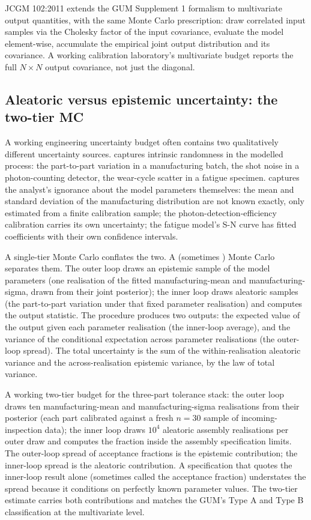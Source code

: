 JCGM 102:2011 \cite{std:jcgm-101} extends the GUM Supplement 1
formalism to multivariate output quantities, with the same Monte
Carlo prescription: draw correlated input samples via the
Cholesky factor of the input covariance, evaluate the model
element-wise, accumulate the empirical joint output distribution
and its covariance. A working calibration laboratory's
multivariate budget reports the full $N \times N$ output
covariance, not just the diagonal.

\subsection{Aleatoric versus epistemic uncertainty: the two-tier MC}

A working engineering uncertainty budget often contains two
qualitatively different uncertainty sources.  captures intrinsic randomness in the modelled
process: the part-to-part variation in a manufacturing batch, the
shot noise in a photon-counting detector, the wear-cycle scatter
in a fatigue specimen.  captures
the analyst's ignorance about the model parameters themselves:
the mean and standard deviation of the manufacturing distribution
are not known exactly, only estimated from a finite calibration
sample; the photon-detection-efficiency calibration carries its
own uncertainty; the fatigue model's S-N curve has fitted
coefficients with their own confidence intervals.

A single-tier Monte Carlo conflates the two. A
 (sometimes ) Monte Carlo
separates them. The outer loop draws an epistemic sample of the
model parameters (one realisation of the fitted manufacturing-mean
and manufacturing-sigma, drawn from their joint posterior); the
inner loop draws aleatoric samples (the part-to-part variation
under that fixed parameter realisation) and computes the output
statistic. The procedure produces two outputs: the
 expected value of the output given each
parameter realisation (the inner-loop average), and the
 variance of the conditional expectation across
parameter realisations (the outer-loop spread). The total
uncertainty is the sum of the within-realisation aleatoric variance
and the across-realisation epistemic variance, by the law of total
variance.

A working two-tier budget for the three-part tolerance stack: the
outer loop draws ten manufacturing-mean and manufacturing-sigma
realisations from their posterior (each part calibrated against a
fresh $n = 30$ sample of incoming-inspection data); the inner loop
draws $10^{4}$ aleatoric assembly realisations per outer draw and
computes the fraction inside the assembly specification limits.
The outer-loop spread of acceptance fractions is the epistemic
contribution; the inner-loop spread is the aleatoric contribution.
A specification that quotes the inner-loop result alone (sometimes
called the  acceptance fraction) understates
the spread because it conditions on perfectly known parameter
values. The two-tier estimate carries both contributions and
matches the GUM's Type A and Type B classification at the
multivariate level.

